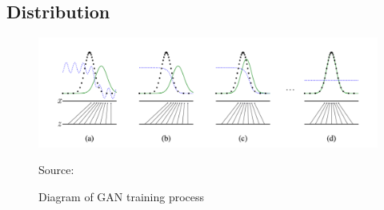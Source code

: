\subsection*{Distribution}



\begin{figure}[H]
    \centering
    \includegraphics[width=1.2\linewidth]{./Images/data_distribution.jpg}
    \caption{Diagram of GAN training process}
    \label{fig:my_picture}
    \vspace{1pt} %
    \small{Source: \cite{goodfellow2014generative}}
\end{figure}